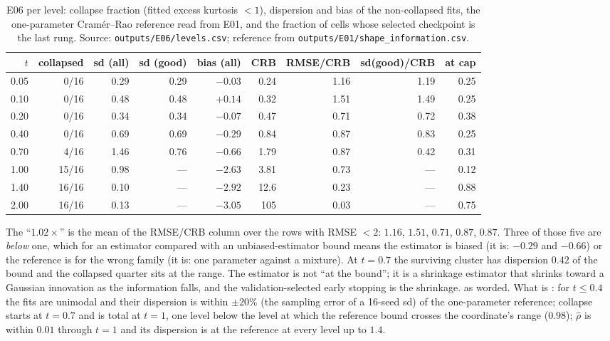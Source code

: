 \begin{table}[h]\centering\small
\caption{E06 per level: collapse fraction (fitted excess kurtosis $<1$), dispersion and bias of the non-collapsed fits, the one-parameter Cram\'er--Rao reference read from E01, and the fraction of cells whose selected checkpoint is the last rung. Source: \texttt{outputs/E06/levels.csv}; reference from \texttt{outputs/E01/shape\_information.csv}.}
\label{tab:e06}
\begin{tabular}{@{}rrrrrrrrr@{}}
\toprule
$t$ & collapsed & sd (all) & sd (good) & bias (all) & CRB & RMSE/CRB & sd(good)/CRB & at cap \\
\midrule
0.05 & 0/16 & 0.29 & 0.29 & $-0.03$ & 0.24 & 1.16 & 1.19 & 0.25 \\
0.10 & 0/16 & 0.48 & 0.48 & $+0.14$ & 0.32 & 1.51 & 1.49 & 0.25 \\
0.20 & 0/16 & 0.34 & 0.34 & $-0.07$ & 0.47 & 0.71 & 0.72 & 0.38 \\
0.40 & 0/16 & 0.69 & 0.69 & $-0.29$ & 0.84 & 0.87 & 0.83 & 0.25 \\
0.70 & 4/16 & 1.46 & 0.76 & $-0.66$ & 1.79 & 0.87 & 0.42 & 0.31 \\
1.00 & 15/16 & 0.98 & --- & $-2.63$ & 3.81 & 0.73 & --- & 0.12 \\
1.40 & 16/16 & 0.10 & --- & $-2.92$ & 12.6 & 0.23 & --- & 0.88 \\
2.00 & 16/16 & 0.13 & --- & $-3.05$ & 105 & 0.03 & --- & 0.75 \\
\bottomrule
\end{tabular}
\end{table}

The ``$1.02\times$'' is the mean of the RMSE/CRB column over the rows with RMSE $<2$: $1.16$, $1.51$, $0.71$, $0.87$, $0.87$. Three of those five are \emph{below} one, which for an estimator compared with an unbiased-estimator bound means the estimator is biased (it is: $-0.29$ and $-0.66$) or the reference is for the wrong family (it is: one parameter against a mixture). At $t=0.7$ the surviving cluster has dispersion $0.42$ of the bound and the collapsed quarter sits at the range. The estimator is not ``at the bound''; it is a shrinkage estimator that shrinks toward a Gaussian innovation as the information falls, and the validation-selected early stopping is the shrinkage.  as worded. What is : for $t\le0.4$ the fits are unimodal and their dispersion is within $\pm20\%$ (the sampling error of a 16-seed sd) of the one-parameter reference; collapse starts at $t=0.7$ and is total at $t=1$, one level below the level at which the reference bound crosses the coordinate's range ($0.98$); $\hat\rho$ is within $0.01$ through $t=1$ and its dispersion is at the reference at every level up to $1.4$.

